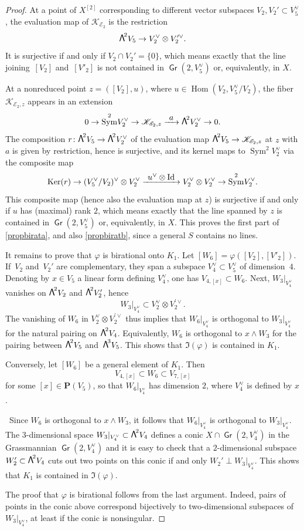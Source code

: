 \documentclass[JEP,XML,SOM,Unicode, NoEqCountersInSection,NoFloatCountersInSection]{cedram}
\let\mathcal\mathscr
\newcommand\To[1]{\mathchoice{\xrightarrow{\textstyle\kern4pt#1\kern3pt}}{\stackrel{#1}{\longrightarrow}}{}{}}
\theoremstyle{definition}
\renewcommand\P{{\mathbf P}}\let\PP\P
\newcommand\cE{\mathcal{E}}
\newcommand\cK{\mathcal{K}}
\DeclareMathOperator{\Gr}{\mathsf{Gr}}
\let\phi\varphi
\let\dual\vee
\DeclareMathOperator{\Hom}{Hom}
\DeclareMathOperator{\Id}{Id}
\DeclareMathOperator{\Ker}{Ker}
\DeclareMathOperator{\Sym}{Sym}
\newcommand\bw[1]{{\hbox{\large$\mathsf{\Lambda}$}^{\!#1}}}
\begin{document}
\begin{proof}
At a point of $ X^{[2]}$ corresponding to different vector subspaces $V_2,V_2' \subset V_5^\dual$, the evaluation map of $ \cK_{\cE_2} $ is the restriction
\[
\bw2V_5\to V_2^\dual\otimes V_2^{\prime\dual}.
\]
It is surjective if and only if
$V_2\cap V_2'=\{0\}$, which means exactly that the line joining~$[V_2]$ and~$[V'_2]$
is not contained in $\Gr(2, V_5^\vee)$ or, equivalently, in $X$.

At a nonreduced point $z=([V_2],u)$, where $u\in\Hom (V_2,V_5^\vee/V_2)$, the fiber $\cK_{\cE_2,z}$ appears in an extension
\[
0\to \Sym^2\!V_2^\vee
\to \cK_{\cE_2,z} \To{a} \bw2V_2^\vee\to 0.
\]
The composition $r\colon\bw2V_5\to \bw2V_2^\vee$ of the evaluation map $\bw2V_5\to \cK_{\cE_2,z}$ at $z$ with $a$ is given by restriction, hence is surjective, and its kernel maps to $\Sym^2\!V_2^\vee$ via the composite map
\[
\Ker(r)\to (V_5^\vee/V_2)^\vee\otimes V_2^\vee \To{u^\vee\otimes \Id} V_2^\vee \otimes V_2^\vee
\to \Sym^2\!V_2^\vee.
\]
This composite map (hence also the evaluation map at $z$) is surjective if and only if $u$ has (maximal) rank $2$, which means exactly that the line spanned by $z$ is contained in $\Gr(2, V_5^\vee)$ or, equivalently, in $X$. This proves the first part of \eqref{propbirata}, and also \eqref{propbiratb}, since a general $S$ contains no lines.

It remains to prove that $\phi$ is birational onto $K_1$. Let $[W_6]=\phi([V_2],[V'_2])$.
If~$V_2$ and~$V_2'$ are complementary, they span a subspace $V_4^\dual\subset V_5^\dual$ of dimension~$4$. Denoting by $x\in V_5$ a linear form defining $V_4^\vee$, one has $V_{4,[x]}\subset W_6$. Next, $W_3\vert_{ V_4^\dual}$ vanishes on $\bw2V_2$ and $\bw2{V_2'}$, hence
\[
W_3\vert_{ V_4^\dual}\subset V_2^\dual\otimes V_2^{\prime\dual}.
\]
The vanishing of $W_6$ in $ V_2^\dual\otimes V_2^{\prime\dual}$ thus implies that
$W_{6}\vert_{V_4^\dual}$ is orthogonal to
$W_3\vert_{ V_4^\dual}$ for the natural pairing on $\bw2V_4$. Equivalently, $W_6$ is orthogonal to
$ x\wedge W_3$ for the pairing between
$\bw2V_5$ and~$ \bw3V_5$.
This shows that $\Im (\phi)$ is contained in
$K_1$.

Conversely, let $[W_6]$ be a general element of
$K_1$. Then
\[
V_{4,[x]}\subset W_6\subset V_{7,[x]}
\]
for some $[x]\in \P(V_5)$, so that $W_6\vert_{V_4^\vee}$ has dimension $2$, where $V_4^\vee$ is defined by $x$.

\ Since $W_6 $ is orthogonal to $ x\wedge W_3$, it follows that
$W_{6}\vert_{ V_4^\dual} $ is orthogonal to $ W_3\vert_{ V_4^\dual}$. The $3$-dimensional space $W_3\vert_{ V_4^\dual}\subset \bw2V_4$ defines
a conic $X\cap \Gr(2,V_4^\dual)$ in the Grassmannian $\Gr(2,V_4^\dual)$ and it is easy to check that
a $2$-dimensional subspace $W_2' \subset \bw2V_4$ cuts out two points on this conic
if and only $W_2'\perp W_3\vert_{ V_4^\dual}$. This shows that $K_1$ is contained in $\Im(\phi)$.

The proof that $\phi$ is birational follows from the last argument. Indeed, pairs of points in the conic above
correspond bijectively to two-dimensional subspaces of $W_3\vert_{ V_4^\dual}$, at least if the conic is nonsingular.
\end{proof}
\end{document}
